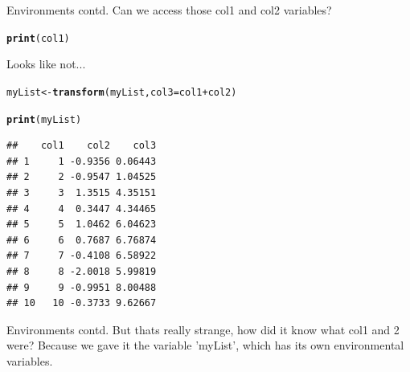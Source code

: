 \documentclass{beamer}\usepackage[]{graphicx}\usepackage[]{color}
\makeatletter
\newcommand{\hlopt}[1]{\textcolor[rgb]{0,0,0}{#1}}%
\newcommand{\hlstd}[1]{\textcolor[rgb]{0.345,0.345,0.345}{#1}}%
\newcommand{\hlkwb}[1]{\textcolor[rgb]{0.69,0.353,0.396}{#1}}%
\newcommand{\hlkwc}[1]{\textcolor[rgb]{0.333,0.667,0.333}{#1}}%
\newcommand{\hlkwd}[1]{\textcolor[rgb]{0.737,0.353,0.396}{\textbf{#1}}}%
\newenvironment{kframe}{%
 \def\at@end@of@kframe{}%
 \ifinner\ifhmode%
  \def\at@end@of@kframe{\end{minipage}}%
  \begin{minipage}{\columnwidth}%
 \fi\fi%
 \def\FrameCommand##1{\hskip\@totalleftmargin \hskip-\fboxsep
 \colorbox{shadecolor}{##1}\hskip-\fboxsep
     \hskip-\linewidth \hskip-\@totalleftmargin \hskip\columnwidth}%
 \MakeFramed {\advance\hsize-\width
   \@totalleftmargin\z@ \linewidth\hsize
   \@setminipage}}%
 {\par\unskip\endMakeFramed%
 \at@end@of@kframe}
\newenvironment{knitrout}{}{} %
\makeatother
\begin{document}
\begin{frame}[fragile]{Environments contd.}
Can we access those col1 and col2 variables?
\begin{knitrout}
\color{fgcolor}\begin{kframe}
\begin{alltt}
\hlkwd{print}\hlstd{(col1)}
\end{alltt}


{\ttfamily\noindent\bfseries\color{errorcolor}{\#\# Error: object 'col1' not found}}\end{kframe}
\end{knitrout}

Looks like not... 
\begin{knitrout}
\color{fgcolor}\begin{kframe}
\begin{alltt}
\hlstd{myList} \hlkwb{<-} \hlkwd{transform}\hlstd{(myList,} \hlkwc{col3} \hlstd{= col1} \hlopt{+} \hlstd{col2)}

\hlkwd{print}\hlstd{(myList)}
\end{alltt}
\begin{verbatim}
##    col1    col2    col3
## 1     1 -0.9356 0.06443
## 2     2 -0.9547 1.04525
## 3     3  1.3515 4.35151
## 4     4  0.3447 4.34465
## 5     5  1.0462 6.04623
## 6     6  0.7687 6.76874
## 7     7 -0.4108 6.58922
## 8     8 -2.0018 5.99819
## 9     9 -0.9951 8.00488
## 10   10 -0.3733 9.62667
\end{verbatim}
\end{kframe}
\end{knitrout}

\end{frame}

\begin{frame}[fragile]{Environments contd.}
But thats really strange, how did it know what col1 and 2 were?
\linebreak
\linebreak
\pause
Because we gave it the variable 'myList', which has its own environmental variables.
\end{frame}
\end{document}
